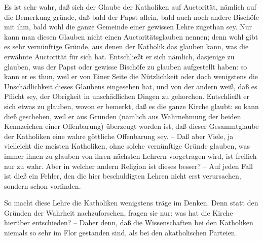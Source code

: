  Es ist sehr wahr, daß sich der Glaube der Katholiken auf Auctorität, nämlich auf die Bemerkung gründe, daß bald der Papst allein, bald auch noch andere Bischöfe mit ihm, bald wohl die ganze Gemeinde einer gewissen Lehre zugethan sey. Nur kann man diesen Glauben nicht einen  Auctoritätsglauben nennen; denn wohl gibt es sehr vernünftige Gründe, aus denen der Katholik das glauben kann, was die erwähnte Auctorität für sich hat. Entschließt er sich nämlich, dasjenige zu glauben, was der Papst oder gewisse Bischöfe zu glauben aufgestellt haben: so kann er es thun, weil er von Einer Seite die Nützlichkeit oder doch wenigstens die Unschädlichkeit dieses Glaubens eingesehen hat, und von der andern weiß, daß es Pflicht sey, der Obrigkeit in unschädlichen Dingen zu gehorchen. Entschließt er sich etwas zu glauben, wovon er bemerkt, daß es die ganze Kirche glaubt: so kann dieß geschehen, weil er aus Gründen (nämlich aus Wahrnehmung der beiden Kennzeichen einer Offenbarung) überzeugt worden ist, daß dieser Gesammtglaube der Katholiken eine wahre göttliche Offenbarung sey. -- Daß aber Viele, ja vielleicht die meisten Katholiken, ohne solche vernünftige Gründe glauben, was immer ihnen zu glauben von ihren nächsten Lehrern vorgetragen wird, ist freilich nur zu wahr. Aber in welcher andern Religion ist dieses besser? -- Auf jeden Fall ist dieß ein Fehler, den die hier beschuldigten Lehren nicht erst verursachen, sondern schon vorfinden.\par
{} So macht diese Lehre die Katholiken wenigstens träge im Denken. Denn statt den Gründen der Wahrheit nachzuforschen, fragen sie nur: was hat die Kirche hierüber entschieden? -- Daher denn, daß die Wissenschaften bei den Katholiken niemals so sehr im Flor gestanden sind, als bei den akatholischen Parteien.\par
